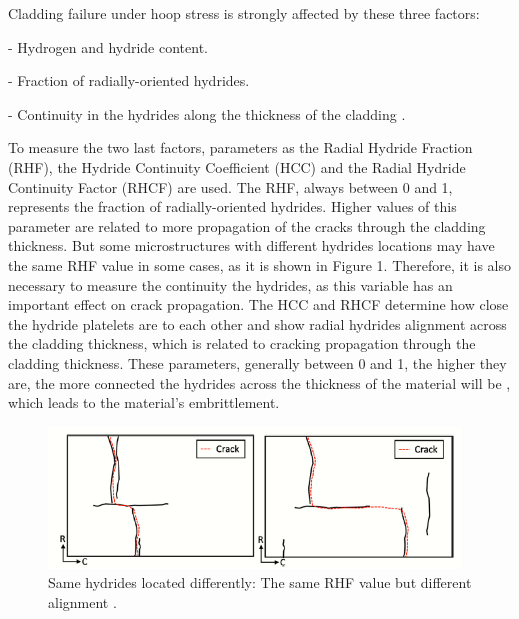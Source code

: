\documentclass[12pt]{article}
\begin{document}
\noindent
Cladding failure under hoop stress is strongly  affected by these three factors:

\vspace{0.1 mm}
- Hydrogen and hydride content.

\vspace{0.1 mm}
- Fraction of radially-oriented hydrides.

\vspace{0.1 mm}
- Continuity in the hydrides along the thickness of the cladding \cite{SIMON2021152817}.

\noindent
To measure the two last factors, parameters as the Radial Hydride Fraction (RHF), the Hydride Continuity Coefficient (HCC) and the Radial Hydride Continuity Factor (RHCF) are used. The RHF, always between 0 and 1, represents the fraction of radially-oriented hydrides. Higher values of this parameter are related to more propagation of the cracks through the cladding thickness. But some microstructures with different hydrides locations may have the same RHF value in some cases, as it is shown in Figure 1. Therefore, it is also necessary to measure the continuity the hydrides, as this variable has an important effect on crack propagation. The HCC and RHCF determine how close the hydride platelets are to each other and show radial hydrides alignment across the cladding thickness, which is related to cracking propagation through the cladding thickness. These parameters, generally between 0 and 1, the higher they are, the more connected the hydrides across the thickness of the material will be \cite{SIMON2021152817}, which leads to the material's embrittlement.

\vspace{50 mm}

\begin{figure}[h] %
    \centering
    \includegraphics[width=4.3in]{same RHF.png}
    \caption{Same hydrides located differently: The same RHF value but different alignment \cite{SIMON2021152817}.}
    \label{fig:my_label}
\end{figure}
\end{document}
